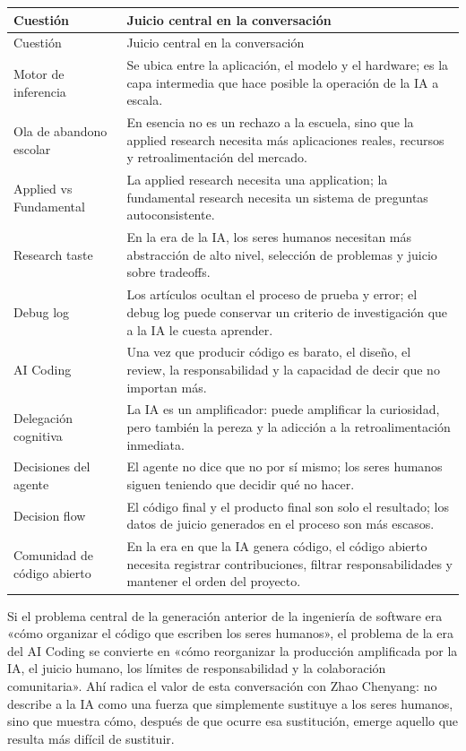 \documentclass[a4paper]{article}
\begin{document}
\begin{longtable}{>{\raggedright\arraybackslash}p{} >{\raggedright\arraybackslash}p{}}
\toprule
Cuestión & Juicio central en la conversación \\
\midrule
\endfirsthead
\toprule
Cuestión & Juicio central en la conversación \\
\midrule
\endhead
Motor de inferencia & Se ubica entre la aplicación, el modelo y el hardware; es la capa intermedia que hace posible la operación de la IA a escala. \\
Ola de abandono escolar & En esencia no es un rechazo a la escuela, sino que la applied research necesita más aplicaciones reales, recursos y retroalimentación del mercado. \\
Applied vs Fundamental & La applied research necesita una application; la fundamental research necesita un sistema de preguntas autoconsistente. \\
Research taste & En la era de la IA, los seres humanos necesitan más abstracción de alto nivel, selección de problemas y juicio sobre tradeoffs. \\
Debug log & Los artículos ocultan el proceso de prueba y error; el debug log puede conservar un criterio de investigación que a la IA le cuesta aprender. \\
AI Coding & Una vez que producir código es barato, el diseño, el review, la responsabilidad y la capacidad de decir que no importan más. \\
Delegación cognitiva & La IA es un amplificador: puede amplificar la curiosidad, pero también la pereza y la adicción a la retroalimentación inmediata. \\
Decisiones del agente & El agente no dice que no por sí mismo; los seres humanos siguen teniendo que decidir qué no hacer. \\
Decision flow & El código final y el producto final son solo el resultado; los datos de juicio generados en el proceso son más escasos. \\
Comunidad de código abierto & En la era en que la IA genera código, el código abierto necesita registrar contribuciones, filtrar responsabilidades y mantener el orden del proyecto. \\
\bottomrule
\end{longtable}

Si el problema central de la generación anterior de la ingeniería de software era «cómo organizar el código que escriben los seres humanos», el problema de la era del AI Coding se convierte en «cómo reorganizar la producción amplificada por la IA, el juicio humano, los límites de responsabilidad y la colaboración comunitaria». Ahí radica el valor de esta conversación con Zhao Chenyang: no describe a la IA como una fuerza que simplemente sustituye a los seres humanos, sino que muestra cómo, después de que ocurre esa sustitución, emerge aquello que resulta más difícil de sustituir.
\end{document}
